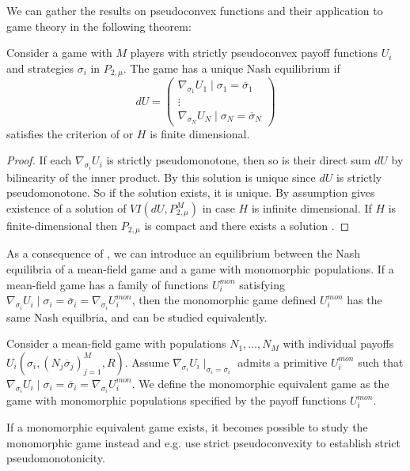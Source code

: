 We can gather the results on pseudoconvex functions and their application to game theory in the following theorem:
\begin{theorem} \label{thm:nash_unique}
  Consider a game with $M$ players with strictly pseudoconvex payoff functions $U_i$ and strategies $\sigma_i$ in $P_{2,\mu}$. The game has a unique Nash equilibrium if
  \begin{equation}
    dU=
    \begin{pmatrix}
      \nabla_{\sigma_1} U_1\mid{\sigma_1 = \overbar{\sigma}_1}\\
      \vdots \\
      \nabla_{\sigma_N} U_N \mid{\sigma_N = \overbar{\sigma}_N}
    \end{pmatrix}
  \end{equation}
  satisfies the criterion of  or $H$ is finite dimensional.
\end{theorem}
\begin{proof}
   If each $\nabla_{\sigma_i} U_i$ is strictly pseudomonotone, then so is their direct sum $dU$ by bilinearity of the inner product. By  this solution is unique since $dU$ is strictly pseudomonotone. So if the solution exists, it is unique. By assumption  gives existence of a solution of $VI(dU,P_{2,\mu}^M)$ in case $H$ is infinite dimensional. If $H$ is finite-dimensional then $P_{2,\mu}$ is compact and there exists a solution .
\end{proof}
As a consequence of , we can introduce an equilibrium between the Nash equilibria of a mean-field game and a game with monomorphic populations. If a mean-field game has a family of functions $U_i^{mon}$ satisfying $\nabla_{\sigma_i} U_i\mid{\sigma_i = \overbar{\sigma}_i} = \nabla_{\sigma_i} U_i^{mon}$, then the monomorphic game defined $U_i^{mon}$ has the same Nash equilbria, and can be studied equivalently.
\begin{definition}
  \label{def:correspondence}
  Consider a mean-field game with populations $N_1,\dots,N_M$ with individual payoffs $U_i(\sigma_i, (N_j \overbar{\sigma}_j)_{j=1}^M, R)$. Assume $\nabla_{\sigma_i}U_i\mid_{\sigma_i=\overbar{\sigma}_i}$ admits a primitive $U_i^{mon}$ such that $\nabla_{\sigma_i} U_i\mid{\sigma_i = \overbar{\sigma}_i} = \nabla_{\sigma_i} U_i^{mon}$.
   We define the monomorphic equivalent game as the game with monomorphic populations specified by the payoff functions $U_i^{mon}$.
\end{definition}
If a monomorphic equivalent game exists, it becomes possible to study the monomorphic game instead and e.g. use strict pseudoconvexity to establish strict pseudomonotonicity.

